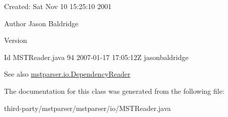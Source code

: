 Created: Sat Nov 10 15:25:10 2001 

\begin{DoxyAuthor}{Author}
Jason Baldridge 
\end{DoxyAuthor}
\begin{DoxyVersion}{Version}

\end{DoxyVersion}
\begin{DoxyParagraph}{Id}
MSTReader.java 94 2007-\/01-\/17 17:05:12Z jasonbaldridge 
\end{DoxyParagraph}
\begin{DoxySeeAlso}{See also}
\hyperlink{classmstparser_1_1io_1_1DependencyReader}{mstparser.io.DependencyReader} 
\end{DoxySeeAlso}


The documentation for this class was generated from the following file:\begin{DoxyCompactItemize}
\item 
third-\/party/mstparser/mstparser/io/MSTReader.java\end{DoxyCompactItemize}
